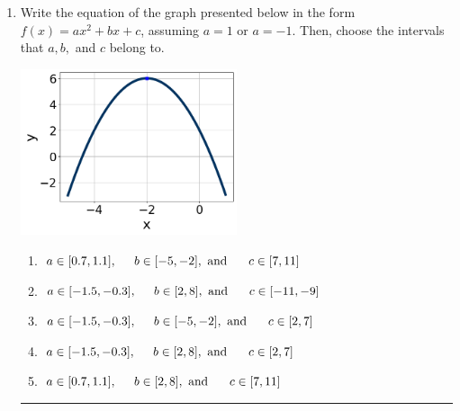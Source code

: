 \documentclass[14pt]{extbook}
\newcommand{\litem}[1]{\item#1\hspace*{-1cm}\rule{\textwidth}{0.4pt}}
\begin{document}
\begin{enumerate}
{\begin{enumerate}[label=\Alph*.]
\end{enumerate} }
\litem{
Write the equation of the graph presented below in the form $f(x)=ax^2+bx+c$, assuming  $a=1$ or $a=-1$. Then, choose the intervals that $a, b,$ and $c$ belong to.
\begin{center}
    \includegraphics[width=0.5\textwidth]{../Figures/quadraticGraphToEquationA.png}
\end{center}
\begin{enumerate}[label=\Alph*.]
\item \( a \in [0.7, 1.1], \hspace*{5mm} b \in [-5, -2], \text{ and } \hspace*{5mm} c \in [7, 11] \)
\item \( a \in [-1.5, -0.3], \hspace*{5mm} b \in [2, 8], \text{ and } \hspace*{5mm} c \in [-11, -9] \)
\item \( a \in [-1.5, -0.3], \hspace*{5mm} b \in [-5, -2], \text{ and } \hspace*{5mm} c \in [2, 7] \)
\item \( a \in [-1.5, -0.3], \hspace*{5mm} b \in [2, 8], \text{ and } \hspace*{5mm} c \in [2, 7] \)
\item \( a \in [0.7, 1.1], \hspace*{5mm} b \in [2, 8], \text{ and } \hspace*{5mm} c \in [7, 11] \)


\end{enumerate}}
\end{enumerate}
\end{document}
